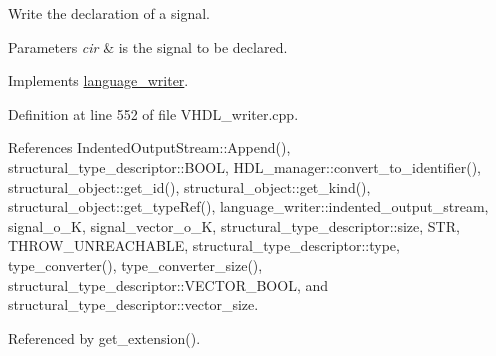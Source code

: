 Write the declaration of a signal. 


\begin{DoxyParams}{Parameters}
{\em cir} & is the signal to be declared. \\
\hline
\end{DoxyParams}


Implements \hyperlink{classlanguage__writer_ae574f2a7e9cb7904172ce08aab243f8e}{language\+\_\+writer}.



Definition at line 552 of file V\+H\+D\+L\+\_\+writer.\+cpp.



References Indented\+Output\+Stream\+::\+Append(), structural\+\_\+type\+\_\+descriptor\+::\+B\+O\+OL, H\+D\+L\+\_\+manager\+::convert\+\_\+to\+\_\+identifier(), structural\+\_\+object\+::get\+\_\+id(), structural\+\_\+object\+::get\+\_\+kind(), structural\+\_\+object\+::get\+\_\+type\+Ref(), language\+\_\+writer\+::indented\+\_\+output\+\_\+stream, signal\+\_\+o\+\_\+K, signal\+\_\+vector\+\_\+o\+\_\+K, structural\+\_\+type\+\_\+descriptor\+::size, S\+TR, T\+H\+R\+O\+W\+\_\+\+U\+N\+R\+E\+A\+C\+H\+A\+B\+LE, structural\+\_\+type\+\_\+descriptor\+::type, type\+\_\+converter(), type\+\_\+converter\+\_\+size(), structural\+\_\+type\+\_\+descriptor\+::\+V\+E\+C\+T\+O\+R\+\_\+\+B\+O\+OL, and structural\+\_\+type\+\_\+descriptor\+::vector\+\_\+size.



Referenced by get\+\_\+extension().

